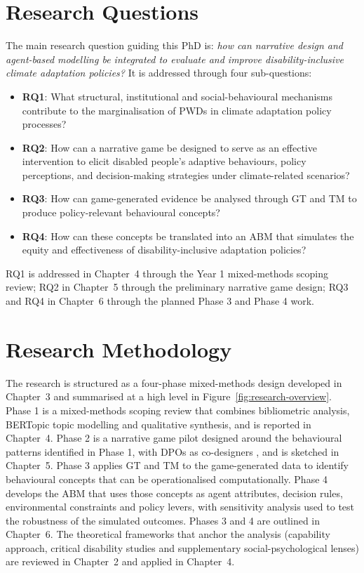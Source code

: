 \documentclass[12pt,a4paper]{report}
\begin{document}
\section{Research Questions}
The main research question guiding this PhD is: \textit{how can narrative design and agent-based modelling be integrated to evaluate and improve disability-inclusive climate adaptation policies?} It is addressed through four sub-questions:
\begin{itemize}
    \item \textbf{RQ1}: What structural, institutional and social-behavioural mechanisms contribute to the marginalisation of PWDs in climate adaptation policy processes?
    \item \textbf{RQ2}: How can a narrative game be designed to serve as an effective intervention to elicit disabled people's adaptive behaviours, policy perceptions, and decision-making strategies under climate-related scenarios?
    \item \textbf{RQ3}: How can game-generated evidence be analysed through GT and TM to produce policy-relevant behavioural concepts?
    \item \textbf{RQ4}: How can these concepts be translated into an ABM that simulates the equity and effectiveness of disability-inclusive adaptation policies?
\end{itemize}
RQ1 is addressed in Chapter~4 through the Year 1 mixed-methods scoping review; RQ2 in Chapter~5 through the preliminary narrative game design; RQ3 and RQ4 in Chapter~6 through the planned Phase 3 and Phase 4 work.

\section{Research Methodology}
The research is structured as a four-phase mixed-methods design developed in Chapter~3 and summarised at a high level in Figure~\ref{fig:research-overview}. Phase 1 is a mixed-methods scoping review that combines bibliometric analysis, BERTopic topic modelling and qualitative synthesis, and is reported in Chapter~4. Phase 2 is a narrative game pilot designed around the behavioural patterns identified in Phase 1, with DPOs as co-designers \cite{pertiwi2019dpo,villeneuve2021pcep}, and is sketched in Chapter~5. Phase 3 applies GT and TM to the game-generated data to identify behavioural concepts that can be operationalised computationally. Phase 4 develops the ABM that uses those concepts as agent attributes, decision rules, environmental constraints and policy levers, with sensitivity analysis used to test the robustness of the simulated outcomes. Phases 3 and 4 are outlined in Chapter~6. The theoretical frameworks that anchor the analysis (capability approach, critical disability studies and supplementary social-psychological lenses) are reviewed in Chapter~2 and applied in Chapter~4.
\end{document}
